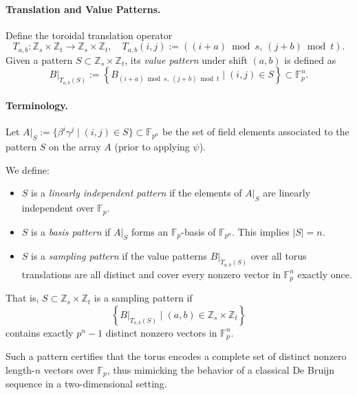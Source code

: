 \documentclass{article}
\begin{document}
\paragraph{Translation and Value Patterns.}
Define the toroidal translation operator
\[
T_{a,b} : \mathbb{Z}_s \times \mathbb{Z}_t \to \mathbb{Z}_s \times \mathbb{Z}_t, \quad
T_{a,b}(i,j) := \left( (i+a) \bmod s,\ (j+b) \bmod t \right).
\]
Given a pattern \( S \subset \mathbb{Z}_s \times \mathbb{Z}_t \), its \emph{value pattern} under shift \( (a,b) \) is defined as
\[
B|_{T_{a,b}(S)} := \left\{ B_{(i+a) \bmod s,\ (j+b) \bmod t} \mid (i,j) \in S \right\} \subset \mathbb{F}_p^n.
\]

\paragraph{Terminology.}
Let \( A|_S := \{ \beta^i \gamma^j \mid (i,j) \in S \} \subset \mathbb{F}_{p^n} \) be the set of field elements associated to the pattern \( S \) on the array \( A \) (prior to applying \( \psi \)).

We define:
\begin{itemize}
  \item \( S \) is a \emph{linearly independent pattern} if the elements of \( A|_S \) are linearly independent over \( \mathbb{F}_p \).
  \item \( S \) is a \emph{basis pattern} if \( A|_S \) forms an \(\mathbb{F}_p\)-basis of \( \mathbb{F}_{p^n} \). This implies \( |S| = n \).
  \item \( S \) is a \emph{sampling pattern} if the value patterns \( B|_{T_{a,b}(S)} \) over all torus translations are all distinct and cover every nonzero vector in \( \mathbb{F}_p^n \) exactly once.
\end{itemize}

That is, \( S \subset \mathbb{Z}_s \times \mathbb{Z}_t \) is a sampling pattern if
\[
\left\{ B|_{T_{a,b}(S)} \mid (a,b) \in \mathbb{Z}_s \times \mathbb{Z}_t \right\}
\]
contains exactly \( p^n - 1 \) distinct nonzero vectors in \( \mathbb{F}_p^n \).

Such a pattern certifies that the torus encodes a complete set of distinct nonzero length-\( n \) vectors over \( \mathbb{F}_p \), thus mimicking the behavior of a classical De Bruijn sequence in a two-dimensional setting.
\end{document}
